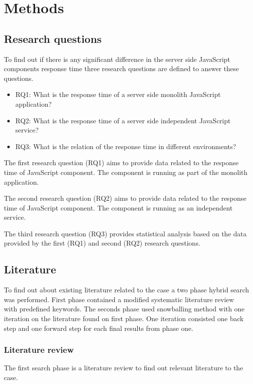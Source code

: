\chapter{Methods\label{methods}}

\section{Research questions}

To find out if there is any significant difference in the server side JavaScript components response time three research questions are defined to answer these questions.

\begin{itemize}
    \item RQ1\label{RQ1}: What is the response time of a server side monolith JavaScript application?
    \item RQ2\label{RQ2}: What is the response time of a server side independent JavaScript service?
    \item RQ3\label{RQ3}: What is the relation of the response time in different environments?
\end{itemize}

The first research question (RQ1) aims to provide data related to the response time of JavaScript component. The component is running as part of the monolith application.

The second research question (RQ2) aims to provide data related to the response time of JavaScript component. The component is running as an independent service.

The third research question (RQ3) provides statistical analysis based on the data provided by the first (RQ1) and second (RQ2) research questions.

\section{Literature}
To find out about existing literature related to the case a two phase hybrid search was performed.
First phase contained a modified systematic literature review with predefined keywords.
The seconds phase used snowballing method with one iteration on the literature found on first phase.
One iteration consisted one back step and one forward step for each final results from phase one.

\subsection{Literature review}
The first search phase is a literature review to find out relevant literature to the case.

